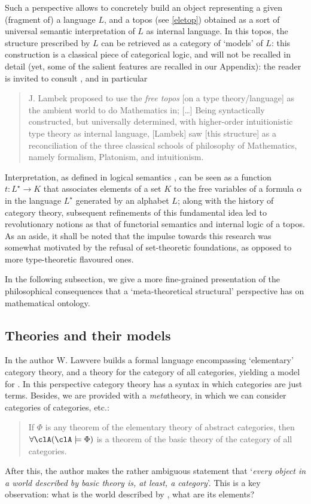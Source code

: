 Such a perspective allows to concretely build an object representing a given (fragment of) a language $L$, and a topos (see \autoref{eletop}) obtained as a sort of universal semantic interpretation of $L$ as internal language. In this topos, the structure prescribed by $L$ can be retrieved as a category of `models' of $L$: this construction is a classical piece of categorical logic, and will not be recalled in detail (yet, some of the salient features are recalled in our Appendix): the reader is invited to consult \cite[II.12, 13, 14]{lambek1988introduction}, and in particular
\begin{quote}
    J. Lambek proposed to use the \emph{free topos} [on a type theory/language] as the ambient world to do Mathematics in; [\dots\unkern] Being syntactically constructed, but universally determined, with higher-order intuitionistic type theory as internal language, [Lambek] saw [this structure] as a reconciliation of the three classical schools of philosophy of Mathematics, namely formalism, Platonism, and intuitionism. \hfill\cite{free_topos}
\end{quote}
Interpretation, as defined in logical semantics \cite{gamut1991logic}, can be seen as a function $t: L^\star \to K$ that associates elements of a set $K$ to the free variables of a formula $\alpha$ in the language $L^\star$ generated by an alphabet $L$; along with the history of category theory, subsequent refinements of this fundamental idea led to revolutionary notions as that of functorial semantics and internal logic of a topos.
As an aside, it shall be noted that the impulse towards this research was somewhat motivated by the refusal of set-theoretic foundations, as opposed to more type-theoretic flavoured ones.

In the following subsection, we give a more fine-grained presentation of the philosophical consequences that a `meta\hyp{}theoretical structural' perspective has on mathematical ontology.
\subsection{Theories and their models}
In \cite{lajolla} the author W. Lawvere builds a formal language  encompassing `elementary' category theory, and a theory  for the category of all categories, yielding a model for . In this perspective category theory has a syntax in which categories are just terms. Besides, we are provided with a \emph{meta}theory, in which we can consider categories of categories, etc.:
\begin{quote}
    If $\Phi$ is any theorem of the elementary theory of abstract categories, then $\forall \clA (\clA \models \Phi)$ is a theorem of the basic theory of the category of all categories. \hfill \cite{lajolla}
\end{quote}
After this, the author makes the rather ambiguous statement that `\textit{every object in a world described by basic theory is, at least, a category}'. This is a key observation: what is the world described by , what are its elements?


